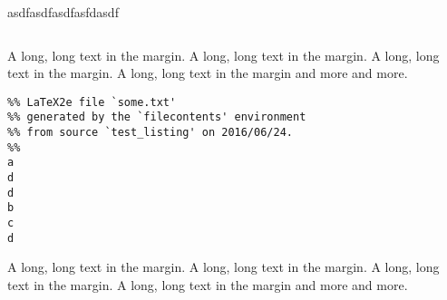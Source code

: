 \documentclass{article}
\begin{document}
\begin{listing}
\begin{margincap}
\inputminted[startinline]{php}{imports/login_1.php}
\caption[asdf]{asdfasdfasdfasfdasdf }
\label{lst:login_query}
\end{margincap}
\end{listing}



\begin{listing}
\begin{margincap}
\inputminted{text}{some.txt}
\caption{A long, long text in the margin. A long, long text in the margin. A long, long text in the margin. A long, long text in the margin and more and more.}
\end{margincap}
\end{listing}

\begin{listing}
\begin{margincap}
\begin{verbatim}
%% LaTeX2e file `some.txt'
%% generated by the `filecontents' environment
%% from source `test_listing' on 2016/06/24.
%%
a
d
d
b
c
d
\end{verbatim}
\caption{A long, long text in the margin. A long, long text in the margin. A long, long text in the margin. A long, long text in the margin and more and more.}
\end{margincap}
\end{listing}
\end{document}
